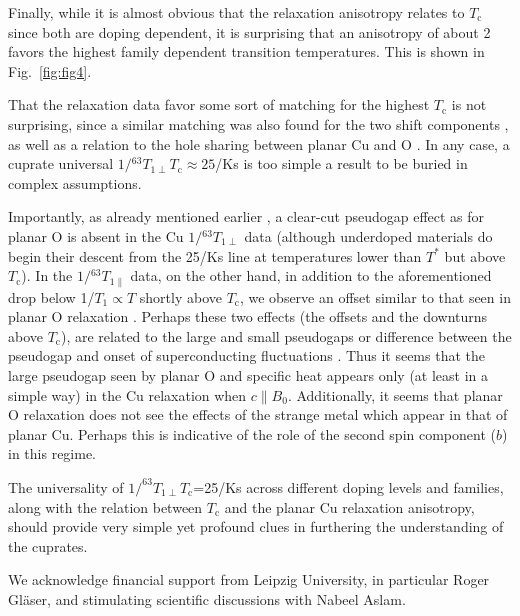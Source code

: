 \documentclass[preprint,superscriptaddress,amsmath,amssymb,aps,physrev,prb,floatfix, fleqn]{revtex4-2} \usepackage{bm} %
\makeatletter
\newcommand{\tc} {\ensuremath{T_{\mathrm c}}\@\xspace}
\newcommand{\cpara}{\ensuremath{{c\parallel\xspace B_0}}\@\xspace}
\makeatother
\begin{document}
Finally, while it is almost obvious that the relaxation anisotropy relates to \tc since both are doping dependent, it is surprising that an anisotropy of about 2 favors the highest family dependent transition temperatures. This is shown in Fig.~\ref{fig:fig4}.


That the relaxation data favor some sort of matching for the highest \tc is not surprising, since a similar matching was also found for the two shift components \cite{Bandur2026}, as well as a relation to the hole sharing between planar Cu and O \cite{Jurkutat2014,Rybicki2016,Jurkutat2023}. 
In any case, a cuprate universal $1/{^{63}T}_{1\perp}T_\mathrm{c} \approx 25$/Ks is too simple a result to be buried in complex assumptions.

Importantly, as already mentioned earlier \cite{Jurkutat2019}, a clear-cut pseudogap effect as for planar O is absent in the Cu  $1/{^{63}T}_{1\perp}$ data (although underdoped materials do begin their descent from the 25/Ks line at temperatures lower than $T^{*}$ but above \tc). In the $1/{^{63}T}_{1\parallel}$ data, on the other hand, in addition to the aforementioned drop below 1/$T_1\propto T$ shortly above \tc, we observe an offset similar to that seen in planar O relaxation \cite{Nachtigal2020}. Perhaps these two effects (the offsets and the downturns above \tc), are related to the large and small pseudogaps \cite{Sato2000} or difference between the pseudogap and onset of superconducting fluctuations \cite{RullierAlbenque2011}. Thus it seems that the large pseudogap seen by planar O and specific heat appears only (at least in a simple way) in the Cu relaxation when \cpara. Additionally, it seems that planar O relaxation does not see the effects of the strange metal which appear in that of planar Cu. Perhaps this is indicative of the role of the second spin component ($b$) in this regime. 

The universality of $1/^{63}T_{1\perp}T_{\mathrm{c}}$=25/Ks across different doping levels and families, along with the relation between \tc and the planar Cu relaxation anisotropy, should provide very simple yet profound clues in furthering the understanding of the cuprates. 




\begin{acknowledgements}
We acknowledge financial support from Leipzig University, in particular Roger Gläser, and stimulating scientific discussions with Nabeel Aslam. 
\end{acknowledgements}
\end{document}
